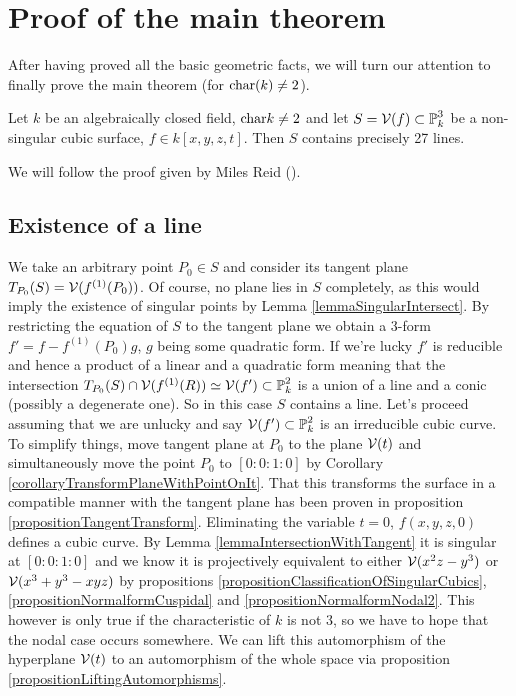 \section{Proof of the main theorem}

After having proved all the basic geometric facts, we will turn our attention to finally prove the main theorem (for ${\operatorname{char}}(k) \neq 2$).
\begin{theorem}
Let $k$ be an algebraically closed field, ${\operatorname{char }} k \neq 2$ and let $S = \operatorname{\mathcal V}(f) \subset \operatorname{\mathbb P}^3_k$ be a non-singular cubic surface, $f\in k[x,y,z,t]$.
Then $S$ contains precisely 27 lines.
\end{theorem}
We will follow the proof given by Miles Reid (\cite[§7]{reid1988undergraduate}).

\subsection{Existence of a line}

We take an arbitrary point $P_0 \in S$ and consider its tangent plane $T_{P_0}(S) = \operatorname{\mathcal V}(f^{(1)}(P_0))$.
Of course, no plane lies in $S$ completely, as this would imply the existence of singular points by Lemma \ref{lemmaSingularIntersect}.
By restricting the equation of $S$ to the tangent plane we obtain a 3-form $f' = f - f^{(1)}(P_0)g$, $g$ being some quadratic form.
If we're lucky $f'$ is reducible and hence a product of a linear and a quadratic form meaning that the intersection $T_{P_0}(S) \cap \operatorname{\mathcal V}(f^{(1)}(R)) \simeq \operatorname{\mathcal V}(f') \subset \operatorname{\mathbb P}^2_k$ is a union of a line and a conic (possibly a degenerate one).
So in this case $S$ contains a line.
Let's proceed assuming that we are unlucky and say $\operatorname{\mathcal V}(f') \subset \operatorname{\mathbb P}^2_k$ is an irreducible cubic curve.
To simplify things, move tangent plane at $P_0$ to the plane $\operatorname{\mathcal V}(t)$ and simultaneously move the point $P_0$ to $[0:0:1:0]$ by Corollary \ref{corollaryTransformPlaneWithPointOnIt}.
That this transforms the surface in a compatible manner with the tangent plane has been proven in proposition \ref{propositionTangentTransform}.
Eliminating the variable $t = 0$, $f(x,y,z,0)$ defines a cubic curve.
By Lemma \ref{lemmaIntersectionWithTangent} it is singular at $[0:0:1:0]$ and we know it is projectively equivalent to either $\operatorname{\mathcal V}(x^2z - y^3)$ or $\operatorname{\mathcal V}(x^3 + y^3 - xyz)$ by propositions \ref{propositionClassificationOfSingularCubics}, \ref{propositionNormalformCuspidal} and \ref{propositionNormalformNodal2}.
This however is only true if the characteristic of $k$ is not $3$, so we have to hope that the nodal case occurs somewhere.
We can lift this automorphism of the hyperplane $\operatorname{\mathcal V}(t)$ to an automorphism of the whole space via proposition \ref{propositionLiftingAutomorphisms}.

